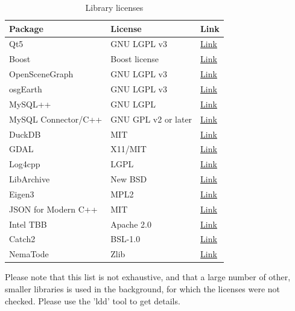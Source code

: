 \begin{table}[H]
  \center
  \begin{tabular}{ | l | l | l |}
    \hline
    \textbf{Package} & \textbf{License} & \textbf{Link} \\ \hline
    Qt5 & GNU LGPL v3 &\href{https://doc.qt.io/qt-5.10/licensing.html}{Link} \\ \hline
    Boost & Boost license  & \href{https://www.boost.org/users/license.html}{Link} \\ \hline
    OpenSceneGraph & GNU LGPL v3 &\href{http://www.openscenegraph.org/index.php/about/licensing}{Link} \\ \hline
    osgEarth & GNU LGPL v3 &\href{https://github.com/gwaldron/osgearth/blob/master/LICENSE.txt}{Link} \\ \hline    
    MySQL++ & GNU LGPL & \href{https://tangentsoft.com/mysqlpp/wiki?name=FAQ}{Link} \\ \hline
    MySQL Connector/C++ & GNU GPL v2 or later & \href{https://downloads.mysql.com/docs/licenses/connector-cpp-gpl-en.pdf}{Link} \\ \hline
    DuckDB & MIT & \href{https://github.com/duckdb/duckdb-web/blob/main/LICENSE}{Link} \\ \hline
    GDAL & X11/MIT & \href{https://trac.osgeo.org/gdal/wiki/FAQGeneral#WhatlicensedoesGDALOGRuse}{Link} \\ \hline
    Log4cpp & LGPL & \href{http://log4cpp.sourceforge.net/#license}{Link} \\ \hline
    LibArchive & New BSD & \href{https://raw.githubusercontent.com/libarchive/libarchive/master/COPYING}{Link} \\ \hline
    Eigen3 & MPL2 & \href{http://eigen.tuxfamily.org/index.php?title=Main_Page}{Link} \\ \hline
    JSON for Modern C++ & MIT & \href{https://github.com/nlohmann/json}{Link} \\ \hline
    Intel TBB & Apache 2.0 & \href{https://www.threadingbuildingblocks.org/}{Link} \\ \hline
    Catch2 & BSL-1.0 & \href{https://github.com/catchorg/Catch2}{Link} \\ \hline
    NemaTode & Zlib & \href{https://github.com/ckgt/NemaTode}{Link} \\ \hline
  \end{tabular}
  \caption{Library licenses}
\end{table}

Please note that this list is not exhaustive, and that a large number of other, smaller libraries is used in the background, for which the licenses were not checked. Please use the 'ldd' tool to get details.

